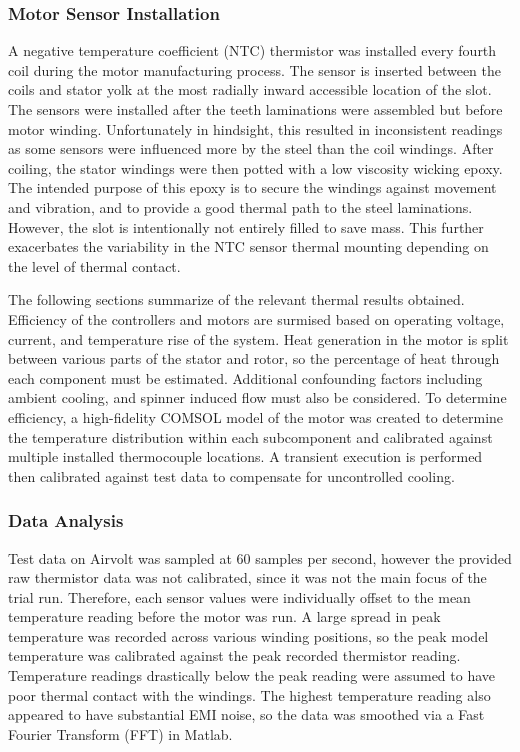 \documentclass[]{aiaa-tc}%
\begin{document}
\subsubsection{Motor Sensor Installation}
A negative temperature coefficient (NTC) thermistor was installed every fourth coil during the motor manufacturing process. The sensor is inserted between the coils and stator yolk at the most radially inward accessible location of the slot. The sensors were installed after the teeth laminations were assembled but before motor winding. Unfortunately in hindsight, this resulted in inconsistent readings as some sensors were influenced more by the steel than the coil windings. After coiling, the stator windings were then potted with a low viscosity wicking epoxy. The intended purpose of this epoxy is to secure the windings against movement and vibration, and to provide a good thermal path to the steel laminations. However, the slot is intentionally not entirely filled to save mass. This further exacerbates the variability in the NTC sensor thermal mounting depending on the level of thermal contact.

The following sections summarize of the relevant thermal results obtained. Efficiency of the controllers and motors are surmised based on operating voltage, current, and temperature rise of the system. Heat generation in the motor is split between various parts of the stator and rotor, so the percentage of heat through each component must be estimated. Additional confounding factors including ambient cooling, and spinner induced flow must also be considered. To determine efficiency, a high-fidelity COMSOL model of the motor was created to determine the temperature distribution within each subcomponent and calibrated against multiple installed thermocouple locations. A transient execution is performed then calibrated against test data to compensate for uncontrolled cooling.


\subsubsection{Data Analysis}

Test data on Airvolt was sampled at 60 samples per second, however the provided raw thermistor data was not calibrated, since it was not the main focus of the trial run. Therefore, each sensor values were individually offset to the mean temperature reading before the motor was run. A large spread in peak temperature was recorded across various winding positions, so the peak model temperature was calibrated against the peak recorded thermistor reading. Temperature readings drastically below the peak reading were assumed to have poor thermal contact with the windings. The highest temperature reading also appeared to have substantial EMI noise, so the data was smoothed via a Fast Fourier Transform (FFT) in Matlab.
\end{document}
